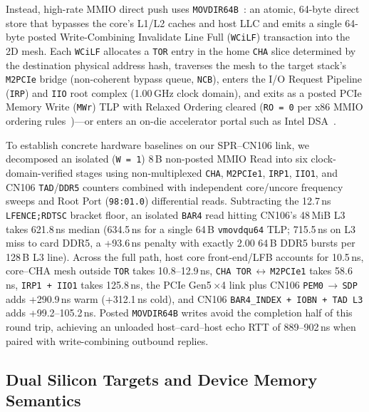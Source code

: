 Instead, high-rate MMIO direct push uses \texttt{MOVDIR64B}~\cite{intelmovdir2024}: an atomic, 64-byte direct store that bypasses the core's L1/L2 caches and host LLC and emits a single 64-byte posted Write-Combining Invalidate Line Full (\texttt{WCiLF}) transaction into the 2D mesh. Each \texttt{WCiLF} allocates a \texttt{TOR} entry in the home \texttt{CHA} slice determined by the destination physical address hash, traverses the mesh to the target stack's \texttt{M2PCIe} bridge (non-coherent bypass queue, \texttt{NCB}), enters the I/O Request Pipeline (\texttt{IRP}) and \texttt{IIO} root complex (1.00\,GHz clock domain), and exits as a posted PCIe Memory Write (\texttt{MWr}) TLP with Relaxed Ordering cleared (\texttt{RO\,=\,0} per x86 MMIO ordering rules~\cite{pcisig2019pcie5})---or enters an on-die accelerator portal such as Intel DSA~\cite{inteldsa2023}.

To establish concrete hardware baselines on our SPR--CN106 link, we decomposed an isolated (\texttt{W\,=\,1}) 8\,B non-posted MMIO Read into six clock-domain-verified stages using non-multiplexed \texttt{CHA}, \texttt{M2PCIe1}, \texttt{IRP1}, \texttt{IIO1}, and CN106 \texttt{TAD}/\texttt{DDR5} counters combined with independent core/uncore frequency sweeps and Root Port (\texttt{98:01.0}) differential reads. Subtracting the 12.7\,ns \texttt{LFENCE;RDTSC} bracket floor, an isolated \texttt{BAR4} read hitting CN106's 48\,MiB L3 takes 621.8\,ns median (634.5\,ns for a single 64\,B \texttt{vmovdqu64} TLP; 715.5\,ns on L3 miss to card DDR5, a +93.6\,ns penalty with exactly 2.00 64\,B DDR5 bursts per 128\,B L3 line). Across the full path, host core front-end/LFB accounts for 10.5\,ns, core--CHA mesh outside \texttt{TOR} takes 10.8--12.9\,ns, \texttt{CHA TOR}\,$\leftrightarrow$\,\texttt{M2PCIe1} takes 58.6\,ns, \texttt{IRP1 + IIO1} takes 125.8\,ns, the PCIe Gen5\,$\times$4 link plus CN106 \texttt{PEM0}\,$\to$\,\texttt{SDP} adds +290.9\,ns warm (+312.1\,ns cold), and CN106 \texttt{BAR4\_INDEX + IOBN + TAD L3} adds +99.2--105.2\,ns. Posted \texttt{MOVDIR64B} writes avoid the completion half of this round trip, achieving an unloaded host--card--host echo RTT of 889--902\,ns when paired with write-combining outbound replies.

\subsection{Dual Silicon Targets and Device Memory Semantics}
\label{sec:bg_targets}

